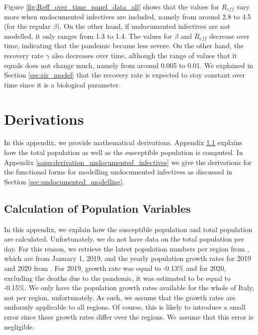 \documentclass[12pt]{article}
\begin{document}
\begin{appendices}
		Figure \ref{fig:Reff_over_time_panel_data_all} shows that the values for $R_{eff}$ vary more when undocumented infectives are included, namely from around 2.8 to 4.5 (for the regular $\beta$). On the other hand, if undocumented infectives are not modelled, it only ranges from 1.3 to 1.4. The values for $\beta$ and $R_{eff}$ decrease over time, indicating that the pandemic became less severe. On the other hand, the recovery rate $\gamma$ also decreases over time, although the range of values that it equals does not change much, namely from around 0.005 to 0.01. We explained in Section \ref{sec:sir_model} that the recovery rate is expected to stay constant over time since it is a biological parameter.
		
		\section{Derivations} \label{app:derivations}
		In this appendix, we provide mathematical derivations. Appendix \ref{sapp:derivation_population_variables} explains how the total population as well as the susceptible population is computed. In Appendix \ref{sapp:derivation_undocumented_infectives} we give the derivations for the functional forms for modelling undocumented infectives as discussed in Section \ref{sec:undocumented_modelling}.
		
		\subsection{Calculation of Population Variables}\label{sapp:derivation_population_variables}
		In this appendix, we explain how the susceptible population and total population are calculated. Unfortunately, we do not have data on the total population per day. For this reason, we retrieve the latest population numbers per region from \textcite{eurostatDatabase}, which are from January 1, 2019, and the yearly population growth rates for 2019 and 2020 from \textcite{worldometer2020italypopulation}. For 2019, growth rate was equal to -0.13\% and for 2020, excluding the deaths due to the pandemic, it was estimated to be equal to -0.15\%. We only have the population growth rates available for the whole of Italy, not per region, unfortunately. As such, we assume that the growth rates are uniformly applicable to all regions. Of course, this is likely to introduce a small error since these growth rates differ over the regions. We assume that this error is negligible. \\
		

\end{appendices}
\end{document}
